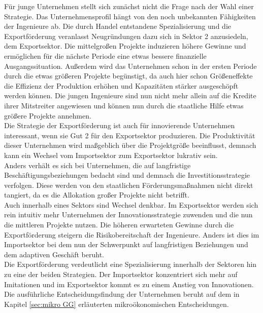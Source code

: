 %
Für junge Unternehmen stellt sich zunächst nicht die Frage nach der Wahl einer Strategie. Das Unternehmensprofil hängt von den noch unbekannten Fähigkeiten der Ingenieure ab. Die durch Handel entstandene Spezialisierung und die Exportförderung veranlasst Neugründungen dazu sich in Sektor 2 anzusiedeln, dem Exportsektor. Die mittelgroßen Projekte induzieren höhere Gewinne und ermöglichen für die nächste Periode eine etwas bessere finanzielle Ausgangssituation.
Außerdem wird das Unternehmen schon in der ersten Periode durch die etwas größeren Projekte begünstigt, da auch hier schon Größeneffekte die Effizienz der Produktion erhöhen und Kapazitäten stärker ausgeschöpft werden können. Die jungen Ingenieure sind nun nicht mehr allein auf die Kredite ihrer Mitstreiter angewiesen und können nun durch die staatliche Hilfe etwas größere Projekte annehmen.\\ 
%
Die Strategie der Exportförderung ist auch für innovierende Unternehmen interessant, wenn sie Gut 2 für den Exportsektor produzieren. Die Produktivität dieser Unternehmen wird maßgeblich über die Projektgröße beeinflusst, demnach kann ein Wechsel vom Importsektor zum Exportsektor lukrativ sein.\\ 
%
Anders verhält es sich bei Unternehmen, die auf langfristige Beschäftigungsbeziehungen bedacht sind und demnach die Investitionsstrategie verfolgen. Diese werden von den staatlichen Förderungsmaßnahmen nicht direkt tangiert, da es die Allokation großer Projekte nicht betrifft.\\ 
%
Auch innerhalb eines Sektors sind Wechsel denkbar. Im Exportsektor werden sich rein intuitiv mehr Unternehmen der Innovationsstrategie zuwenden und die nun die mittleren Projekte nutzen. Die höheren erwarteten Gewinne durch die Exportförderung steigern die Risikobereitschaft der Ingenieure. Anders ist dies im Importsektor bei dem nun der Schwerpunkt auf langfristigen Beziehungen und dem adaptiven Geschäft beruht.\\
Die Exportförderung verdeutlicht eine Spezialisierung innerhalb der Sektoren hin zu eine der beiden Strategien. Der Importsektor konzentriert sich mehr auf Imitationen und im Exportsektor kommt es zu einem Anstieg von Innovationen. Die ausführliche Entscheidungsfindung der Unternehmen beruht auf dem in Kapitel \ref{sec:mikro GG} erläuterten mikroökonomischen Entscheidungen.
%
